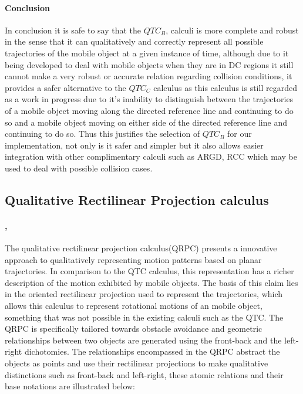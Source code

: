 	\paragraph{Conclusion}\cite{van2004representing}In conclusion it is safe to say that the $QTC_B$, calculi is more complete and robust in the sense that it can qualitatively and correctly represent all possible trajectories of the mobile object at a given instance of time, although due to it being developed to deal with mobile objects when they are in DC regions \cite{van2006qualitative} it still cannot make a very robust or accurate relation regarding collision conditions, it provides a safer alternative to the $QTC_C$ calculus as this calculus is still regarded as a work in progress \cite{van2005qualitative}due to it's inability to distinguish between the trajectories of a mobile object moving along the directed reference line and continuing to do so and a mobile object moving on either side of the directed reference line and continuing to do so. Thus this justifies the selection of $QTC_B$ for our implementation, not only is it safer and simpler but it also allows easier integration with other complimentary calculi such as ARGD, RCC which may be used to deal with possible collision cases.

	\subsection{Qualitative Rectilinear Projection calculus}
	\paragraph{\cite{glez2013qrpc}, \cite{alvarez2006guide}} The qualitative rectilinear projection calculus(QRPC) presents a innovative approach to qualitatively representing motion patterns based on planar trajectories. In comparison to the QTC calculus, this representation has a richer description of the motion exhibited by mobile objects. The basis of this claim lies in the oriented rectilinear projection used to represent the trajectories, which allows this calculus to represent rotational motions of an mobile object, something that was not possible in the existing calculi such as the QTC. The QRPC is specifically tailored towards obstacle avoidance and geometric relationships between two objects are generated using the front-back and the left-right dichotomies. The relationships encompassed in the QRPC abstract the objects as points and use their rectilinear projections to make qualitative distinctions such as front-back and left-right, these atomic relations and their base notations are illustrated below:
	
